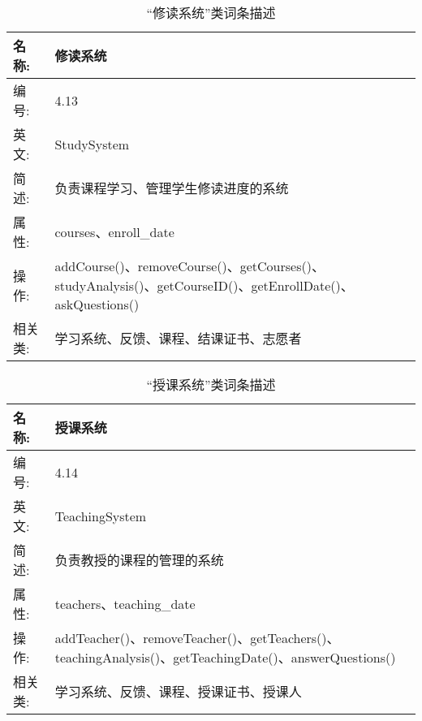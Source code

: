 \begin{table}[H]  
\caption{“修读系统”类词条描述}  
\begin{center}  
    \begin{tabular}{l p{11cm}} 
        \hline
        \quad 名称:  &  修读系统 \\
        \hline
        \quad 编号:  & 4.13 \\
        \hline
        \quad 英文:  &  StudySystem \\
        \hline
        \quad 简述:  & 负责课程学习、管理学生修读进度的系统 \\
        \hline
        \quad 属性:  & courses、enroll\_date\\
        \hline
        \quad 操作:  & addCourse()、removeCourse()、getCourses()、studyAnalysis()、getCourseID()、getEnrollDate()、askQuestions()\\
        \hline
        \quad 相关类:  & 学习系统、反馈、课程、结课证书、志愿者 \\
        \hline
    \end{tabular}
\end{center}
\end{table}

\begin{table}[H]  
\caption{“授课系统”类词条描述}  
\begin{center}  
    \begin{tabular}{l p{11cm}} 
        \hline
        \quad 名称:  &  授课系统 \\
        \hline
        \quad 编号:  & 4.14 \\
        \hline
        \quad 英文:  &  TeachingSystem \\
        \hline
        \quad 简述:  & 负责教授的课程的管理的系统 \\
        \hline
        \quad 属性:  & teachers、teaching\_date\\
        \hline
        \quad 操作:  & addTeacher()、removeTeacher()、getTeachers()、teachingAnalysis()、getTeachingDate()、answerQuestions()\\
        \hline
        \quad 相关类:  & 学习系统、反馈、课程、授课证书、授课人 \\
        \hline
    \end{tabular}
\end{center}
\end{table}